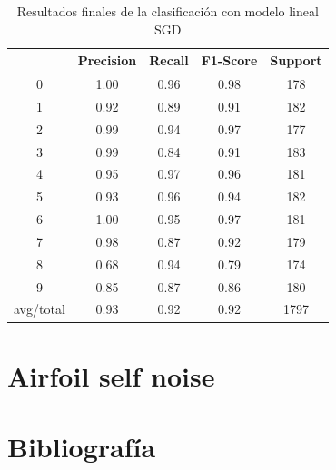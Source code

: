 \begin{table}[H]
	\centering
	\begin{tabular}{|c|c|c|c|c|}
		\hline
		& Precision & Recall & F1-Score & Support \\ \hline
		0         & 1.00      & 0.96   & 0.98     & 178     \\ \hline
		1         & 0.92      & 0.89   & 0.91     & 182     \\ \hline
		2         & 0.99      & 0.94   & 0.97     & 177     \\ \hline
		3         & 0.99      & 0.84   & 0.91     & 183     \\ \hline
		4         & 0.95      & 0.97   & 0.96     & 181     \\ \hline
		5         & 0.93      & 0.96   & 0.94     & 182     \\ \hline
		6         & 1.00      & 0.95   & 0.97     & 181     \\ \hline
		7         & 0.98      & 0.87   & 0.92     & 179     \\ \hline
		8         & 0.68      & 0.94   & 0.79     & 174     \\ \hline
		9         & 0.85      & 0.87   & 0.86     & 180     \\ \hline
		avg/total & 0.93      & 0.92   & 0.92     & 1797    \\ \hline
	\end{tabular}
	\caption{Resultados finales de la clasificación con modelo lineal SGD}
\end{table}



\newpage 
\section{Airfoil self noise}
\newpage
\section{Bibliografía}





